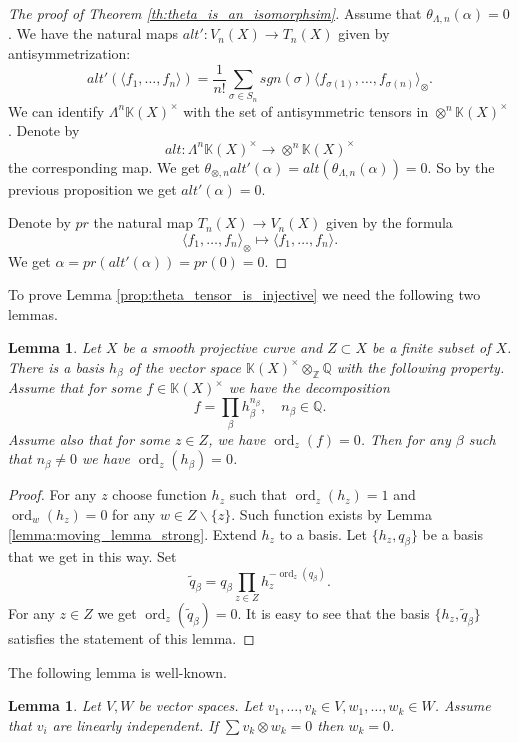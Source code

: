 \documentclass[12pt]{extarticle}
\newtheorem{lemma}[theorem]{Lemma}
\def\mb{\mathbb}
\def\k{\mb K}
\def\Z{\mb Z}
\def\Q{\mb Q}
\def\wt{\widetilde}
\def\bs{\backslash}
\newcommand{\EP}[2]{{\Lambda^{#1}\k(#2)^\times}}
\DeclareMathOperator{\ord}{ord}
\begin{document}
\begin{proof}[The proof of Theorem \ref{th:theta_is_an_isomorphsim}]
    Assume that $\theta_{\Lambda,n}(\alpha)=0$. We have the natural maps $alt'\colon V_n(X)\to T_{n}(X)$ given by antisymmetrization:
    $$alt'(\langle f_1,\dots, f_n\rangle)=\dfrac 1{n!}\sum_{\sigma\in S_n}sgn(\sigma)\langle f_{\sigma(1)},\dots, f_{\sigma(n)} \rangle_\otimes.$$
    We can identify $\EP nX$ with the set of antisymmetric tensors in $\otimes^n\k(X)^\times$. Denote by  $$alt\colon \EP nX\to \otimes^n \k(X)^\times$$the corresponding map. We get $\theta_{\otimes, n}alt'(\alpha)=alt(\theta_{\Lambda,n}(\alpha))=0.$ So by the previous proposition we get $alt'(\alpha)=0$.

    Denote by $pr$ the natural map $T_{n}(X)\to V_n(X)$ given by the formula
    $$\langle f_1,\dots, f_n\rangle_\otimes\mapsto \langle f_1,\dots, f_n\rangle.$$
    We get $\alpha=pr(alt'(\alpha))=pr(0)=0$.
\end{proof}

To prove Lemma \ref{prop:theta_tensor_is_injective} we need the following two lemmas.

\begin{lemma}
\label{lemma:about_basis}
    Let $X$ be a smooth projective curve and $Z\subset X$ be a finite subset of $X$. There is a basis $h_\beta$ of the vector space $\k(X)^\times\otimes_\Z\Q$ with the following property.  Assume that for some $f\in \k(X)^\times$ we have the decomposition $$f=\prod_\beta  h_\beta^{n_\beta},\quad n_\beta\in \Q.$$
Assume also that for some $z\in Z$, we have $\ord_z(f)=0$. Then for any $\beta$ such that $n_\beta\ne 0$ we have $\ord_z(h_\beta)=0$.
\end{lemma}

\begin{proof}
    For any $z$ choose function $h_z$ such that $\ord_z(h_z)=1$ and $\ord_w(h_z)=0$ for any $w\in Z\bs\{z\}$. Such function exists by Lemma \ref{lemma:moving_lemma_strong}. Extend $h_z$ to a basis. Let $\{h_z,q_\beta\}$ be a basis that we get in this way. Set $$\wt q_\beta=q_\beta\prod_{z\in Z} h_z^{-\ord_z(q_\beta)}.$$
    For any $z\in Z$ we get $\ord_z(\wt q_\beta)=0$. 
It is easy to see that the basis $\{h_z,\wt q_\beta\}$ satisfies the statement of this lemma.
\end{proof}

The following lemma is well-known.

\begin{lemma}
\label{lemma:linear_independence}
    Let $V,W$ be vector spaces. Let $v_1,\dots, v_k\in V, w_1,\dots, w_k\in W$. Assume that $v_i$ are linearly independent. If
    $\sum v_k\otimes w_k=0$ then $w_k=0$.
\end{lemma}
\end{document}
